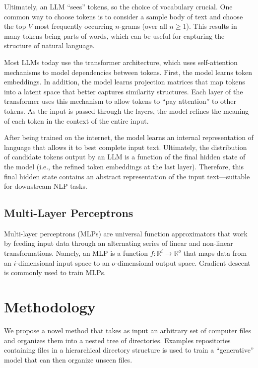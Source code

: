 \documentclass{article}
\begin{document}
Ultimately, an LLM ``sees'' tokens, so the choice of vocabulary crucial. One common way to choose tokens is to consider a sample body of text and choose the top $V$ most frequently occurring $n$-grams (over all $n\ge 1$). This results in many tokens being parts of words, which can be useful for capturing the structure of natural language.

Most LLMs today use the transformer architecture, which uses self-attention mechanisms to model dependencies between tokens. First, the model learns token embeddings. In addition, the model learns projection matrices that map tokens into a latent space that better captures similarity structures. Each layer of the transformer uses this mechanism to allow tokens to ``pay attention'' to other tokens. As the input is passed through the layers, the model refines the meaning of each token in the context of the entire input.

After being trained on the internet, the model learns an internal representation of language that allows it to best complete input text. Ultimately, the distribution of candidate tokens output by an LLM is a function of the final hidden state of the model (i.e., the refined token embeddings at the last layer). Therefore, this final hidden state contains an abstract representation of the input text---suitable for downstream NLP tasks.

\subsection{Multi-Layer Perceptrons}

Multi-layer perceptrons (MLPs) are universal function approximators that work by feeding input data through an alternating series of linear and non-linear transformations. Namely, an MLP is a function $f: \mathbb{R}^i \rightarrow \mathbb{R}^o$ that maps data from an $i$-dimensional input space to an $o$-dimensional output space. Gradient descent is commonly used to train MLPs.

\section{Methodology}

We propose a novel method that takes as input an arbitrary set of computer files and organizes them into a nested tree of directories. Examples repositories containing files in a hierarchical directory structure is used to train a ``generative'' model that can then organize unseen files.
\end{document}
